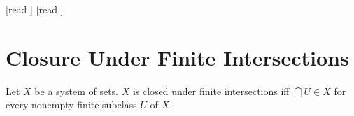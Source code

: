 \documentclass[10pt]{article}
\begin{document}
  \begin{imports}
    \begin{forthel}
      [read ]
      [read ]
    \end{forthel}
  \end{imports}


  \section*{Closure Under Finite Intersections}

  \begin{forthel}
    \begin{definition}[id=FOUNDATIONS_14_4297814324543488,printid]
      Let $X$ be a system of sets.
      $X$ is closed under finite intersections iff $\bigcap U \in X$ for every nonempty finite subclass $U$ of $X$.
    \end{definition}
  \end{forthel}
\end{document}
